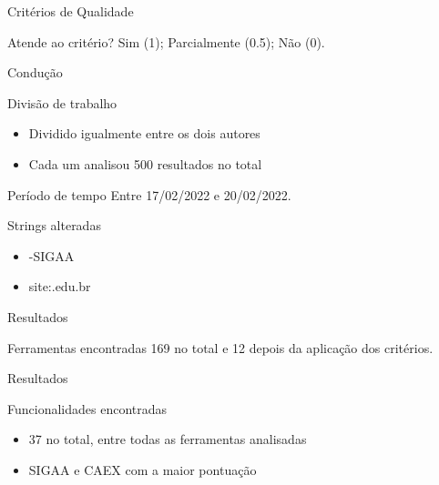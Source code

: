 \begin{frame}{{\sffamily Critérios de Qualidade}}
  \begin{block}{Atende ao critério?}
    Sim (1); Parcialmente (0.5); Não (0).
  \end{block}
  
\end{frame}

\begin{frame}{{\sffamily Condução}}
  \begin{block}{Divisão de trabalho}
    \begin{itemize}
      \item Dividido igualmente entre os dois autores
      \item Cada um analisou 500 resultados no total
    \end{itemize}
  \end{block}
  \begin{block}{Período de tempo}
    Entre 17/02/2022 e 20/02/2022.
  \end{block}
  \begin{block}{Strings alteradas}
    \begin{itemize}
      \item -SIGAA
      \item site:.edu.br
    \end{itemize}
  \end{block}
\end{frame}

\begin{frame}{{\sffamily Resultados}}
  \begin{block}{Ferramentas encontradas}
    169 no total e 12 depois da aplicação dos critérios.
  \end{block}
  
\end{frame}

\begin{frame}{{\sffamily Resultados}}
  \begin{block}{Funcionalidades encontradas}
    \begin{itemize}
      \item 37 no total, entre todas as ferramentas analisadas
      \item SIGAA e CAEX com a maior pontuação
    \end{itemize}
  \end{block}
  

\end{frame}
